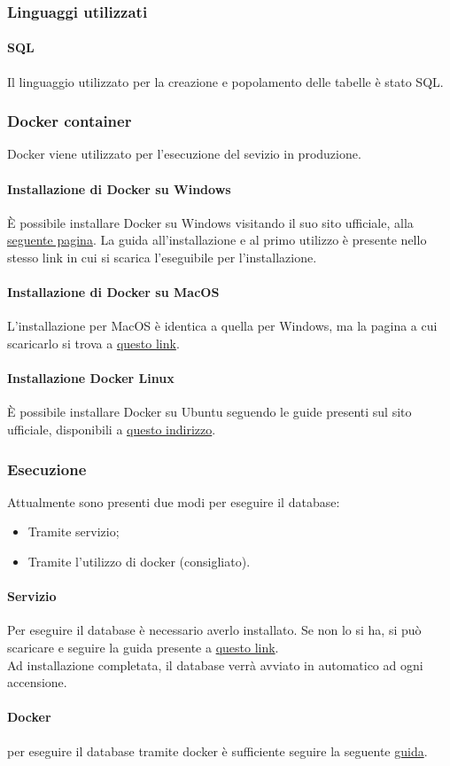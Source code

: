 \subsubsection{Linguaggi utilizzati}
\paragraph{SQL}
Il linguaggio utilizzato per la creazione e popolamento delle tabelle è stato SQL.

\subsubsection{Docker container}
Docker viene utilizzato per l'esecuzione del sevizio in produzione.
\paragraph{Installazione di Docker su Windows}
È possibile installare Docker su Windows visitando il suo sito ufficiale, alla \href{https://hub.docker.com/editions/community/docker-ce-desktop-windows}{seguente pagina}. La guida all'installazione e al primo utilizzo è presente nello stesso link in cui si scarica l'eseguibile per l'installazione.
\paragraph{Installazione di Docker su MacOS}
L'installazione per MacOS è identica a quella per Windows, ma la pagina a cui scaricarlo si trova a \href{https://hub.docker.com/editions/community/docker-ce-desktop-mac}{questo link}.
\paragraph{Installazione Docker Linux}
È possibile installare Docker su Ubuntu seguendo le guide presenti sul sito ufficiale, disponibili a \href{https://docs.docker.com/engine/install/ubuntu/}{questo indirizzo}.

\subsubsection{Esecuzione}
Attualmente sono presenti due modi per eseguire il database:
\begin{itemize}
	\item Tramite servizio;
	\item Tramite l'utilizzo di docker (consigliato).
\end{itemize}
\paragraph{Servizio}
Per eseguire il database è necessario averlo installato. Se non lo si ha, si può scaricare e seguire la guida presente a \href{https://mariadb.org/download/}{questo link}. \\
Ad installazione completata, il database verrà avviato in automatico ad ogni accensione.
\paragraph{Docker}
per eseguire il database tramite docker è sufficiente seguire la seguente \href{https://hub.docker.com/\_/mariadb}{guida}.